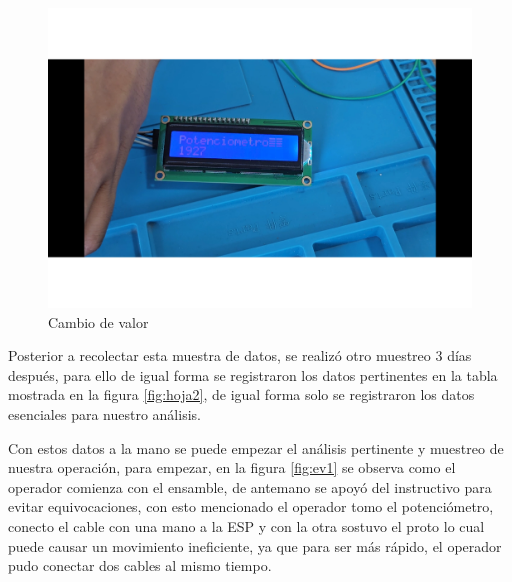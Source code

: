     
    \begin{figure}[H]
        \centering
        \includegraphics[trim =  {25mm 25mm 25mm 10mm},clip,scale=0.3]{22/Img/e20.pdf}
        \caption{Cambio de valor}
        \label{fig:evi8}
    \end{figure}
    
    Posterior a recolectar esta muestra de datos, se realizó otro muestreo 3 días después, para ello de igual forma se registraron los datos pertinentes en la tabla mostrada en la figura \ref{fig:hoja2}, de igual forma solo se registraron los datos esenciales para nuestro análisis.
    
    
     Con estos datos a la mano se puede empezar el análisis pertinente y muestreo de nuestra operación, para empezar, en la figura \ref{fig:ev1} se observa como el operador comienza con el ensamble, de antemano se apoyó del instructivo para evitar equivocaciones, con esto mencionado el operador tomo el potenciómetro, conecto el cable con una mano a la ESP y con la otra sostuvo el proto lo cual puede causar un movimiento ineficiente, ya que para ser más rápido, el operador pudo conectar dos cables al mismo tiempo.
    
